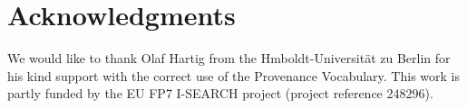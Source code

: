 \documentclass{acm_proc_article-sp}
\begin{document}

\section{Acknowledgments}\label{sec:acknowledgments}
We would like to thank Olaf Hartig from the Hmboldt-Universit\"{a}t zu Berlin for his kind support with the correct use of the Provenance Vocabulary. This work is partly funded by the EU FP7 I-SEARCH project (project reference 248296).

%

%
%

\appendix
\end{document}
